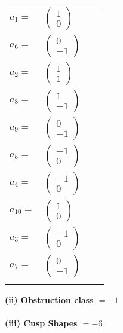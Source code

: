 \documentclass[1p]{elsarticle_modified}
\theoremstyle{definition}
\begin{document}
\begin{tabular}{m{7pt} m{180pt} m{7pt} m{180pt} }
\flushright $a_{1}=$&$\begin{pmatrix}1\\0\end{pmatrix}$ \\
\flushright $a_{6}=$&$\begin{pmatrix}0\\-1\end{pmatrix}$ \\
\flushright $a_{2}=$&$\begin{pmatrix}1\\1\end{pmatrix}$ \\
\flushright $a_{8}=$&$\begin{pmatrix}1\\-1\end{pmatrix}$ \\
\flushright $a_{9}=$&$\begin{pmatrix}0\\-1\end{pmatrix}$ \\
\flushright $a_{5}=$&$\begin{pmatrix}-1\\0\end{pmatrix}$ \\
\flushright $a_{4}=$&$\begin{pmatrix}-1\\0\end{pmatrix}$ \\
\flushright $a_{10}=$&$\begin{pmatrix}1\\0\end{pmatrix}$ \\
\flushright $a_{3}=$&$\begin{pmatrix}-1\\0\end{pmatrix}$ \\
\flushright $a_{7}=$&$\begin{pmatrix}0\\-1\end{pmatrix}$\\&\end{tabular}
\flushleft \textbf{(ii) Obstruction class $= -1$}\\~\\
\flushleft \textbf{(iii) Cusp Shapes $= -6$}\\~\\
\end{document}
